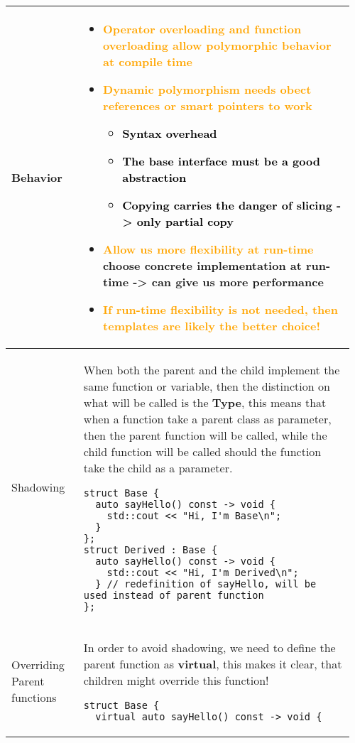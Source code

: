 \documentclass[main.tex,fontsize=8pt,paper=a4,paper=portrait,DIV=calc]{scrartcl}
\begin{document}
\begin{table}[ht!]
\begin{tabular}{|m{0.2\linewidth}|m{0.755\linewidth}|}
\hline
Behavior & 
\vspace{2mm}
\begin{itemize}
\item \textcolor{orange}{Operator overloading and function overloading allow polymorphic behavior at compile time }
\item \textcolor{orange}{Dynamic polymorphism needs obect references or smart pointers to work}\newline
  \begin{itemize}
  \item \textcolor{black}{Syntax overhead}
  \item \textcolor{black}{The base interface must be a good abstraction}
  \item \textcolor{black}{Copying carries the danger of \textbf{slicing -> only partial copy}}
  \end{itemize} 
\item \textcolor{orange}{Allow us more flexibility at run-time}\newline
  choose concrete implementation at run-time -> can give us more performance
\item \textcolor{orange}{If run-time flexibility is not needed, then templates are likely the better choice!}
\vspace{-3mm}
\end{itemize} 
\\
\hline
Shadowing &
When both the parent and the child implement the same function or variable, then the distinction on what will be called is the \textbf{Type}, this means that when a function take a parent class as parameter, then the parent function will be called, while the child function will be called should the function take the child as a parameter.\newline
\begin{lstlisting}
struct Base {
  auto sayHello() const -> void {
    std::cout << "Hi, I'm Base\n";
  }
};
struct Derived : Base {
  auto sayHello() const -> void {
    std::cout << "Hi, I'm Derived\n";
  } // redefinition of sayHello, will be used instead of parent function
};
\end{lstlisting}
\\
\hline
Overriding Parent functions & 
In order to avoid shadowing, we need to define the parent function as \textbf{virtual}, this makes it clear, that children might override this function!\newline
\begin{lstlisting}
struct Base {
  virtual auto sayHello() const -> void {

\end{lstlisting}
\end{tabular}
\end{table}
\end{document}
